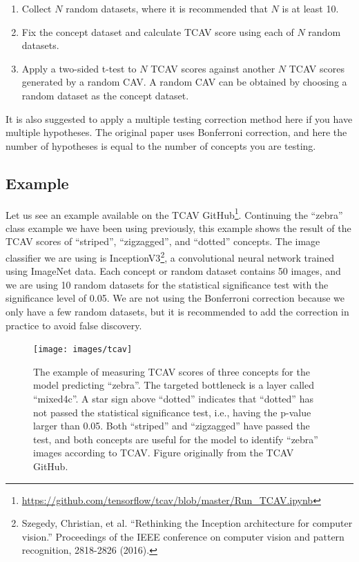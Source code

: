 \documentclass[12pt,]{krantz}
\providecommand{\tightlist}{%
  \setlength{\itemsep}{0pt}\setlength{\parskip}{0pt}}
\renewcommand{\href}[2]{#2\footnote{\url{#1}}}
\begin{document}
\begin{enumerate}
\def\labelenumi{\arabic{enumi}.}
\tightlist
\item
  Collect \(N\) random datasets, where it is recommended that \(N\) is
  at least 10.
\item
  Fix the concept dataset and calculate TCAV score using each of \(N\)
  random datasets.
\item
  Apply a two-sided t-test to \(N\) TCAV scores against another \(N\)
  TCAV scores generated by a random CAV. A random CAV can be obtained by
  choosing a random dataset as the concept dataset.
\end{enumerate}

It is also suggested to apply a multiple testing correction method here
if you have multiple hypotheses. The original paper uses Bonferroni
correction, and here the number of hypotheses is equal to the number of
concepts you are testing.

\subsection{Example}\label{example-9}

Let us see an example available on the TCAV
\href{https://github.com/tensorflow/tcav/blob/master/Run_TCAV.ipynb}{GitHub}.
Continuing the ``zebra'' class example we have been using previously,
this example shows the result of the TCAV scores of ``striped'',
``zigzagged'', and ``dotted'' concepts. The image classifier we are
using is InceptionV3\footnote{Szegedy, Christian, et al. ``Rethinking
  the Inception architecture for computer vision.'' Proceedings of the
  IEEE conference on computer vision and pattern recognition, 2818-2826
  (2016).}, a convolutional neural network trained using ImageNet data.
Each concept or random dataset contains 50 images, and we are using 10
random datasets for the statistical significance test with the
significance level of 0.05. We are not using the Bonferroni correction
because we only have a few random datasets, but it is recommended to add
the correction in practice to avoid false discovery.

\begin{figure}

{\centering \texttt{[image: images/tcav]} 

}

\caption{The example of measuring TCAV scores of three concepts for the model predicting “zebra”. The targeted bottleneck is a layer called “mixed4c”. A star sign above “dotted” indicates that “dotted” has not passed the statistical significance test, i.e., having the p-value larger than 0.05. Both “striped” and “zigzagged” have passed the test, and both concepts are useful for the model to identify “zebra” images according to TCAV. Figure originally from the TCAV GitHub.}\label{fig:unnamed-chunk-64}
\end{figure}
\end{document}
